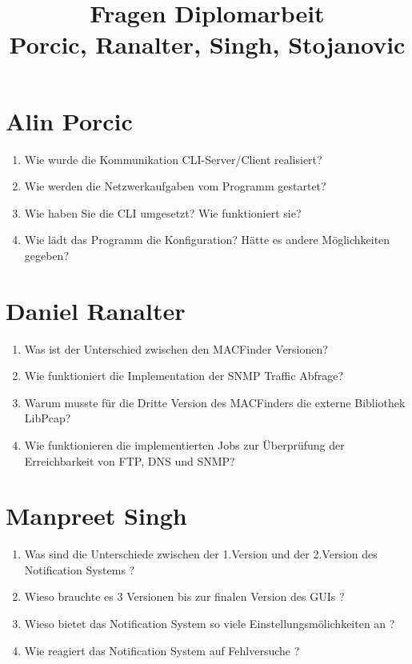 \documentclass[a4paper]{report}
\title{Fragen Diplomarbeit \\Porcic, Ranalter, Singh, Stojanovic}
\begin{document}
\maketitle
\chapter{Alin Porcic}
\begin{enumerate}
\item Wie wurde die Kommunikation CLI-Server/Client realisiert?
\item Wie werden die Netzwerkaufgaben vom Programm gestartet?
\item Wie haben Sie die CLI umgesetzt? Wie funktioniert sie?
\item Wie lädt das Programm die Konfiguration? Hätte es andere Möglichkeiten gegeben?
\end{enumerate}

\chapter{Daniel Ranalter}
\begin{enumerate}
\item Was ist der Unterschied zwischen den MACFinder Versionen?
\item Wie funktioniert die Implementation der SNMP Traffic Abfrage?
\item Warum musste für die Dritte Version des MACFinders die externe Bibliothek LibPcap?
\item Wie funktionieren die implementierten Jobs zur Überprüfung der Erreichbarkeit von FTP, DNS und SNMP?
\end{enumerate}

\chapter{Manpreet Singh}
\begin{enumerate}
\item Was sind die Unterschiede zwischen der 1.Version und der 2.Version des Notification Systems ?
\item Wieso brauchte es 3 Versionen bis zur finalen Version des GUIs ?
\item Wieso bietet das Notification System so viele Einstellungsmölichkeiten an ?
\item Wie reagiert das Notification System auf Fehlversuche ?
\end{enumerate}
\end{document}
